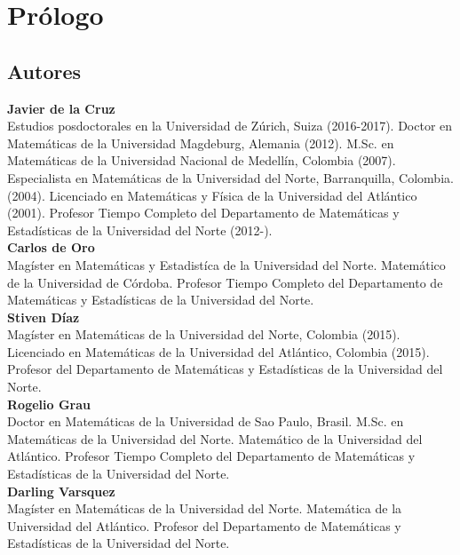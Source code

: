  
\chapter*{Pr\'ologo}

\section*{Autores}
\justify
\noindent \textbf{Javier de la Cruz}\\
Estudios posdoctorales en la Universidad de Z\'urich, Suiza (2016-2017). Doctor en Matem\'aticas de la Universidad Magdeburg, Alemania (2012). M.Sc. en Matem\'aticas de la Universidad Nacional de Medell\'in, Colombia (2007). Especialista en Matemáticas de la Universidad del Norte, Barranquilla, Colombia. (2004). Licenciado en Matem\'aticas y F\'isica de la Universidad del Atl\'antico (2001). Profesor Tiempo Completo del Departamento de Matem\'aticas y Estad\'isticas de la Universidad del Norte (2012-). \\


\noindent \textbf{Carlos de Oro} \\
Mag\'ister en Matem\'aticas y Estadist\'ica de la Universidad del Norte. Matem\'atico de la Universidad de C\'ordoba. Profesor Tiempo Completo del Departamento de Matem\'aticas y Estad\'isticas de la Universidad del Norte. \\

\noindent \textbf{Stiven D\'iaz} \\
Mag\'ister en Matem\'aticas de la Universidad del Norte, Colombia (2015). Licenciado en Matem\'aticas de la Universidad del Atl\'antico, Colombia (2015). Profesor del Departamento de Matem\'aticas y Estad\'isticas de la Universidad del Norte. \\

\noindent \textbf{Rogelio Grau} \\
Doctor en Matem\'aticas de la Universidad de Sao Paulo, Brasil. M.Sc. en Matem\'aticas de la Universidad del Norte. Matem\'atico de la Universidad del Atl\'antico. Profesor Tiempo Completo del Departamento de Matem\'aticas y Estad\'isticas de la Universidad del Norte. \\

\noindent \textbf{Darling Varsquez} \\
Mag\'ister en Matem\'aticas de la Universidad del Norte. Matem\'atica de la Universidad del Atl\'antico. Profesor del Departamento de Matem\'aticas y Estad\'isticas de la Universidad del Norte. \\

